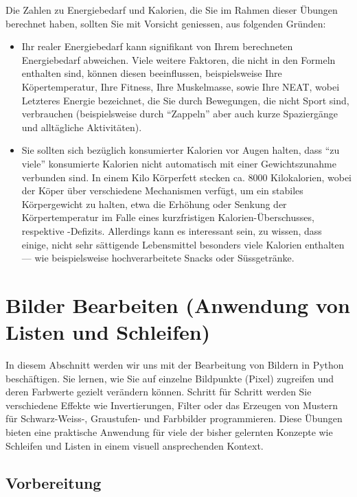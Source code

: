 \begin{mycaution}
	Die Zahlen zu Energiebedarf und Kalorien, die Sie im Rahmen dieser Übungen berechnet haben, sollten Sie mit Vorsicht geniessen, aus folgenden Gründen:
	\begin{itemize}
		\item Ihr realer Energiebedarf kann signifikant von Ihrem berechneten Energiebedarf abweichen. Viele weitere Faktoren, die nicht in den Formeln enthalten sind, können diesen beeinflussen, beispielsweise Ihre Köpertemperatur, Ihre Fitness, Ihre Muskelmasse, sowie Ihre \gls{NEAT}, wobei Letzteres Energie bezeichnet, die Sie durch Bewegungen, die nicht Sport sind, verbrauchen (beispielsweise durch \enquote{Zappeln} aber auch kurze Spaziergänge und alltägliche Aktivitäten).
		\item Sie sollten sich bezüglich konsumierter Kalorien vor Augen halten, dass \enquote{zu viele} konsumierte Kalorien nicht automatisch mit einer Gewichtszunahme verbunden sind. In einem Kilo Körperfett stecken ca. 8000 Kilokalorien, wobei der Köper über verschiedene Mechanismen verfügt, um ein stabiles Körpergewicht zu halten, etwa die Erhöhung oder Senkung der Körpertemperatur im Falle eines kurzfristigen Kalorien-Überschusses, respektive -Defizits. Allerdings kann es interessant sein, zu wissen, dass einige, nicht sehr sättigende Lebensmittel besonders viele Kalorien enthalten --- wie beispielsweise hochverarbeitete Snacks oder Süssgetränke.
	\end{itemize}
\end{mycaution}


\clearpage
\section{Bilder Bearbeiten (Anwendung von Listen und Schleifen)}
In diesem Abschnitt werden wir uns mit der Bearbeitung von Bildern in Python beschäftigen.
Sie lernen, wie Sie auf einzelne Bildpunkte (Pixel) zugreifen und deren Farbwerte gezielt verändern können.
Schritt für Schritt werden Sie verschiedene Effekte wie Invertierungen, Filter oder das Erzeugen von Mustern für Schwarz-Weiss-, Graustufen- und Farbbilder programmieren.
Diese Übungen bieten eine praktische Anwendung für viele der bisher gelernten Konzepte wie Schleifen und Listen in einem visuell ansprechenden Kontext.

\subsection{Vorbereitung}

